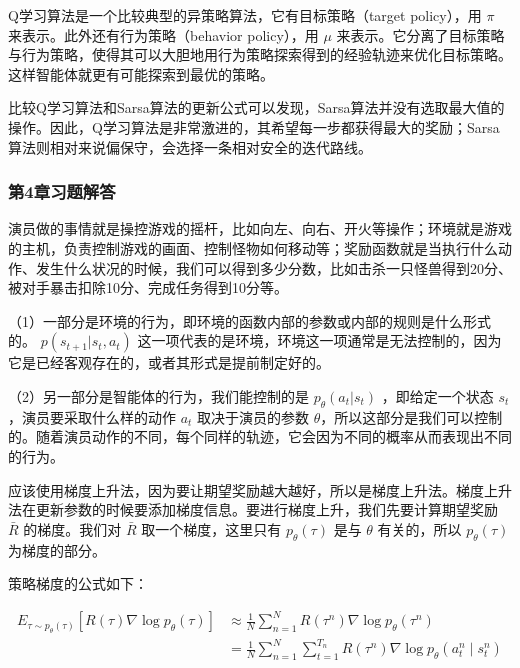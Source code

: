 Q学习算法是一个比较典型的异策略算法，它有目标策略（target policy），用 $\pi$ 来表示。此外还有行为策略（behavior policy），用 $\mu$ 来表示。它分离了目标策略与行为策略，使得其可以大胆地用行为策略探索得到的经验轨迹来优化目标策略。这样智能体就更有可能探索到最优的策略。

比较Q学习算法和Sarsa算法的更新公式可以发现，Sarsa算法并没有选取最大值的操作。因此，Q学习算法是非常激进的，其希望每一步都获得最大的奖励；Sarsa算法则相对来说偏保守，会选择一条相对安全的迭代路线。



\subsubsection*{第4章习题解答}


演员做的事情就是操控游戏的摇杆，比如向左、向右、开火等操作；环境就是游戏的主机，负责控制游戏的画面、控制怪物如何移动等；奖励函数就是当执行什么动作、发生什么状况的时候，我们可以得到多少分数，比如击杀一只怪兽得到20分、被对手暴击扣除10分、完成任务得到10分等。


（1）一部分是环境的行为，即环境的函数内部的参数或内部的规则是什么形式的。 $p(s_{t+1}|s_t,a_t)$ 这一项代表的是环境，环境这一项通常是无法控制的，因为它是已经客观存在的，或者其形式是提前制定好的。
  
（2）另一部分是智能体的行为，我们能控制的是 $p_\theta(a_t|s_t)$ ，即给定一个状态 $s_t$，演员要采取什么样的动作 $a_t$ 取决于演员的参数 $\theta$，所以这部分是我们可以控制的。随着演员动作的不同，每个同样的轨迹，它会因为不同的概率从而表现出不同的行为。


应该使用梯度上升法，因为要让期望奖励越大越好，所以是梯度上升法。梯度上升法在更新参数的时候要添加梯度信息。要进行梯度上升，我们先要计算期望奖励 $\bar{R}$ 的梯度。我们对 $\bar{R}$ 取一个梯度，这里只有 $p_{\theta}(\tau)$ 是与 $\theta$ 有关的，所以 $p_{\theta}(\tau)$ 为梯度的部分。


策略梯度的公式如下：

$$
\begin{aligned}
E_{\tau \sim p_{\theta}(\tau)}\left[R(\tau) \nabla \log p_{\theta}(\tau)\right] &\approx \frac{1}{N} \sum_{n=1}^{N} R\left(\tau^{n}\right) \nabla \log p_{\theta}\left(\tau^{n}\right) \\
&=\frac{1}{N} \sum_{n=1}^{N} \sum_{t=1}^{T_{n}} R\left(\tau^{n}\right) \nabla \log p_{\theta}\left(a_{t}^{n} \mid s_{t}^{n}\right)
\end{aligned}
$$

